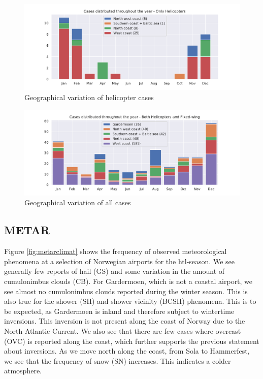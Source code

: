 \begin{figure}
    \centering
    \includegraphics[width=\textwidth]{Figures/Helisoner.pdf}
    \caption{Geographical variation of helicopter cases}
    \label{fig:helisoner}
\end{figure}

\begin{figure}
    \centering
    \includegraphics[width=\textwidth]{Figures/soner.pdf}
    \caption{Geographical variation of all cases}
    \label{fig:soner}
\end{figure}

\subsection{METAR}
Figure \ref{fig:metarclimat} shows the frequency of observed meteorological phenomena at a selection of Norwegian airports for the \acrshort{htl}-season. We see generally few reports of hail (GS) and some variation in the amount of cumulonimbus clouds (CB). For Gardermoen, which is not a coastal airport, we see almost no cumulonimbus clouds reported during the winter season. This is also true for the shower (SH) and shower vicinity (BCSH) phenomena. This is to be expected, as Gardermoen is inland and therefore subject to wintertime inversions. This inversion is not present along the coast of Norway due to the North Atlantic Current. We also see that there are few cases where overcast (OVC) is reported along the coast, which further supports the previous statement about inversions. As we move north along the coast, from Sola to Hammerfest, we see that the frequency of snow (SN) increases. This indicates a colder atmosphere.


